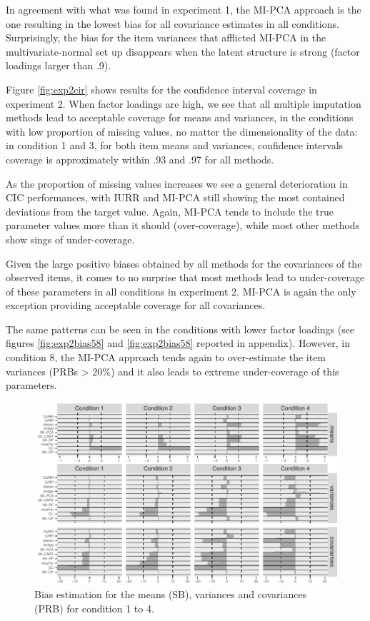 	In agreement with what was found in experiment 1, the MI-PCA approach is the one resulting in the lowest
	bias for all covariance estimates in all conditions.
	Surprisingly, the bias for the item variances that afflicted MI-PCA in the multivariate-normal
	set up disappears when the latent structure is strong (factor loadings larger than .9).

	Figure \ref{fig:exp2cir} shows results for the confidence interval coverage in experiment 2.
	When factor loadings are high, we see that all multiple imputation methods lead to acceptable coverage 
	for means and variances, in the conditions with low proportion of missing values, no matter the 
	dimensionality of the data: in condition 1 and 3, for both item means and variances, confidence 
	intervals coverage is approximately within .93 and .97 for all methods.

	As the proportion of missing values increases we see a general deterioration in CIC performances, 
	with IURR and MI-PCA still showing the most contained deviations from the target value.
	Again, MI-PCA tends to include the true parameter values more than it should (over-coverage), 
	while most other methods show sings of under-coverage.

	Given the large positive biases obtained by all methods for the covariances of the observed items,
	it comes to no surprise that most methods lead to under-coverage of these parameters in all
	conditions in experiment 2. 
	MI-PCA is again the only exception providing acceptable coverage for all covariances.

	The same patterns can be seen in the conditions with lower factor loadings (see figures \ref{fig:exp2bias58} 
	and \ref{fig:exp2bias58} reported in appendix).
	However, in condition 8, the MI-PCA approach tends again to over-estimate the item variances (PRBs > 20\%)
	and it also leads to extreme under-coverage of this parameters.

\begin{figure}
	\includegraphics{../../output/graphs/exp2_semR_bias_sd_14.pdf}
\caption{Bias estimation for the means (SB), variances and covariances (PRB) for condition 1 to 4.}
\label{fig:exp2bias}
\end{figure}

